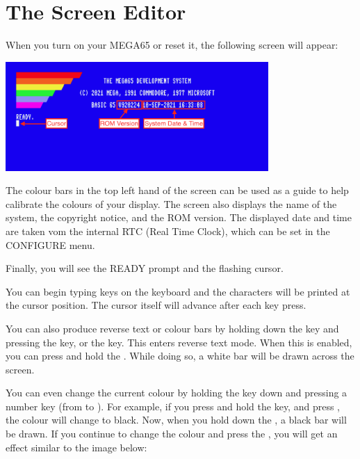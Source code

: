 \section{The Screen Editor}
\label{sec:screen-editor}

When you turn on your MEGA65 or reset it, the following screen will appear:

\begin{center}
\includegraphics[width={10cm}]{images/introduction-screen/layout.png}
\end{center}

The colour bars in the top left hand of the screen can be used
as a guide to help calibrate the colours of your display.
The screen also displays the name of the system,
the copyright notice, and the ROM version.
The displayed date and time are taken vom the internal RTC
(Real Time Clock), which can be set in the CONFIGURE menu.

Finally, you will see the READY prompt and the flashing cursor.

You can begin typing keys on the keyboard and the characters will be
printed at the cursor position. The cursor itself will advance after
each key press.

You can also produce reverse text or colour bars by holding down the  key and pressing the  key, or the  key. This enters reverse text mode. When this is enabled, you can press and hold the . While doing so, a white bar will be drawn across the screen.

You can even change the current colour by holding the  key down and pressing a number key (from  to ). For example, if you press and hold the  key, and press , the colour will change to black. Now, when you hold down the , a black bar will be drawn. If you continue to change the colour and press the , you will get an effect similar to the image below:


